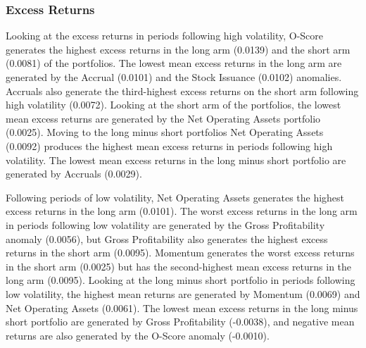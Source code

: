 \documentclass[a4paper]{article}                 %
\begin{document}
\subsubsection{Excess Returns}
Looking at the excess returns in periods following high volatility, O-Score generates the highest excess returns in the long arm (0.0139) and the short arm (0.0081) of the portfolios. The lowest mean excess returns in the long arm are generated by the Accrual (0.0101) and the Stock Issuance (0.0102) anomalies. Accruals also generate the third-highest excess returns on the short arm following high volatility (0.0072). Looking at the short arm of the portfolios, the lowest mean excess returns are generated by the Net Operating Assets portfolio (0.0025). Moving to the long minus short portfolios Net Operating Assets (0.0092) produces the highest mean excess returns in periods following high volatility. The lowest mean excess returns in the long minus short portfolio are generated by Accruals (0.0029).

Following periods of low volatility, Net Operating Assets generates the highest excess returns in the long arm (0.0101). The worst excess returns in the long arm in periods following low volatility are generated by the Gross Profitability anomaly (0.0056), but Gross Profitability also generates the highest excess returns in the short arm (0.0095).  Momentum generates the worst excess returns in the short arm (0.0025) but has the second-highest mean excess returns in the long arm (0.0095). Looking at the long minus short portfolio in periods following low volatility, the highest mean returns are generated by Momentum (0.0069) and Net Operating Assets (0.0061). The lowest mean excess returns in the long minus short portfolio are generated by Gross Profitability (-0.0038), and negative mean returns are also generated by the O-Score anomaly (-0.0010).
\end{document}
